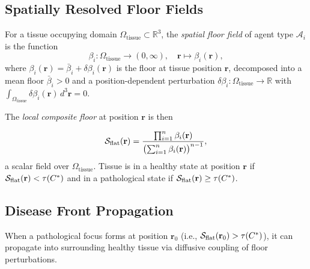 \subsection{Spatially Resolved Floor Fields}

\begin{definition}
\label{def:ch02b-spatial-floor}
For a tissue occupying domain $\Omega_{\mathrm{tissue}} \subset \mathbb{R}^3$,
the \emph{spatial floor field} of agent type $\mathcal{A}_i$ is the function
\begin{equation}
  \beta_i : \Omega_{\mathrm{tissue}} \to (0, \infty),
  \quad
  \mathbf{r} \mapsto \beta_i(\mathbf{r}),
  \label{eq:ch02b-spatial-floor}
\end{equation}
where $\beta_i(\mathbf{r}) = \bar\beta_i + \delta\beta_i(\mathbf{r})$ is the
floor at tissue position $\mathbf{r}$, decomposed into a mean floor
$\bar\beta_i > 0$ and a position-dependent perturbation $\delta\beta_i :
\Omega_{\mathrm{tissue}} \to \mathbb{R}$ with $\int_{\Omega_{\mathrm{tissue}}}
\delta\beta_i(\mathbf{r})\, d^3\mathbf{r} = 0$.
\end{definition}

The \emph{local composite floor} at position $\mathbf{r}$ is then

\begin{equation}
  \mathcal{S}_{\mathrm{flat}}(\mathbf{r})
  = \frac{\prod_{i=1}^n \beta_i(\mathbf{r})}
         {\bigl(\sum_{i=1}^n \beta_i(\mathbf{r})\bigr)^{n-1}},
  \label{eq:ch02b-local-floor}
\end{equation}
a scalar field over $\Omega_{\mathrm{tissue}}$.  Tissue is in a healthy state
at position $\mathbf{r}$ if $\mathcal{S}_{\mathrm{flat}}(\mathbf{r}) < \tau(C^*)$
and in a pathological state if $\mathcal{S}_{\mathrm{flat}}(\mathbf{r}) \geq
\tau(C^*)$.

\subsection{Disease Front Propagation}

When a pathological focus forms at position $\mathbf{r}_0$ (i.e.,
$\mathcal{S}_{\mathrm{flat}}(\mathbf{r}_0) > \tau(C^*)$), it can propagate into
surrounding healthy tissue via diffusive coupling of floor perturbations.

